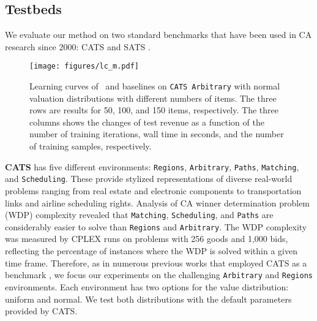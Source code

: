 
\subsection{Testbeds}

We evaluate our method on two standard benchmarks that have been used in
CA research since 2000: CATS \citep{leyton2000towards} and SATS \citep{weiss2017sats}. 

\begin{figure}
    \centering
    \texttt{[image: figures/lc\_m.pdf]}
    \caption{Learning curves of \name~and baselines on \texttt{CATS Arbitrary} with normal valuation distributions with different numbers of items. The three rows are results for 50, 100, and 150 items, respectively. The three columns shows the changes of test revenue as a function of the number of training iterations, wall time in seconds, and the number of training samples, respectively. 
    \label{fig:lcm}}
\end{figure}

\textbf{CATS} has five different environments: \texttt{Regions}, \texttt{Arbitrary}, \texttt{Paths}, \texttt{Matching}, and \texttt{Scheduling}. These provide stylized representations of diverse real-world problems ranging from real estate and electronic components to transportation links and airline scheduling rights. Analysis of CA winner determination problem (WDP) complexity \citep{catshardness} revealed that \texttt{Matching}, \texttt{Scheduling}, and \texttt{Paths} are considerably easier to solve than \texttt{Regions} and \texttt{Arbitrary}. The WDP complexity was measured by CPLEX runs on problems with 256 goods and 1,000 %
bids, reflecting the percentage of instances where the WDP is solved within a given time frame. Therefore, as in numerous previous works that employed CATS as a benchmark \citep{gasse2019exact, hutter2009paramils, hutter2014algorithm, balcan2018learning, scavuzzo2022learning, wu2021learning, huang2023searching, song2020general, gupta2022lookback, balcan2021sample, zhang2022deep}, we focus our experiments on the challenging \texttt{Arbitrary} and  \texttt{Regions} environments. Each environment has two options for the value distribution: uniform and normal. We test both distributions with the default parameters provided by CATS.

